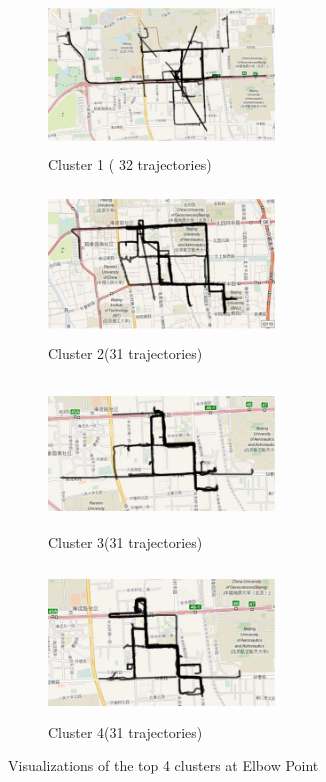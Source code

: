 \begin{figure}
    \centering
    \begin{subfigure}[t]{.5\textwidth}
        \centering
        \includegraphics[width=6cm,height=4cm,keepaspectratio]{figs/new/Elbow_Cluster1.eps}
        \caption{Cluster 1 ( 32 trajectories)}
    \end{subfigure}%
    \begin{subfigure}[t]{.5\textwidth}
        \centering
        \includegraphics[width=6cm,height=4cm,keepaspectratio]{figs/new/Elbow_Cluster2.eps}
        \caption{Cluster 2(31 trajectories)}
    \end{subfigure}
        
    \begin{subfigure}[t]{.5\textwidth}
        \centering
        \includegraphics[width=6cm,height=4cm,keepaspectratio]{figs/new/Elbow_Cluster3.eps}
        \caption{Cluster 3(31 trajectories)}
    \end{subfigure}%
    \begin{subfigure}[t]{.5\textwidth}
        \centering
        \includegraphics[width=6cm,height=4cm,keepaspectratio]{figs/new/Elbow_Cluster4.eps}
        \caption{Cluster 4(31 trajectories)}
    \end{subfigure}
    \caption{Visualizations of the top 4 clusters at Elbow Point}
    \label{fig:elbowVisual}
\end{figure}

